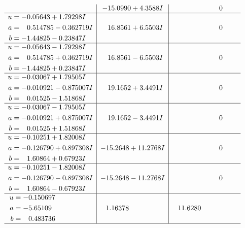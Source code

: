 \documentclass[1p]{elsarticle_modified}
\theoremstyle{definition}
\begin{document}
$$\begin{array}{c|c|c}
 & -15.0990 + 4.3588 I & \phantom{-0.000000 } 0 \\ \hline\begin{aligned}
u &= -0.05643 + 1.79298 I \\
a &= \phantom{-}0.514785 - 0.362719 I \\
b &= -1.44825 - 0.23847 I\end{aligned}
 & \phantom{-}16.8561 + 6.5503 I & \phantom{-0.000000 } 0 \\ \hline\begin{aligned}
u &= -0.05643 - 1.79298 I \\
a &= \phantom{-}0.514785 + 0.362719 I \\
b &= -1.44825 + 0.23847 I\end{aligned}
 & \phantom{-}16.8561 - 6.5503 I & \phantom{-0.000000 } 0 \\ \hline\begin{aligned}
u &= -0.03067 + 1.79505 I \\
a &= -0.010921 - 0.875007 I \\
b &= \phantom{-}0.01525 - 1.51868 I\end{aligned}
 & \phantom{-}19.1652 + 3.4491 I & \phantom{-0.000000 } 0 \\ \hline\begin{aligned}
u &= -0.03067 - 1.79505 I \\
a &= -0.010921 + 0.875007 I \\
b &= \phantom{-}0.01525 + 1.51868 I\end{aligned}
 & \phantom{-}19.1652 - 3.4491 I & \phantom{-0.000000 } 0 \\ \hline\begin{aligned}
u &= -0.10251 + 1.82008 I \\
a &= -0.126790 + 0.897308 I \\
b &= \phantom{-}1.60864 + 0.67923 I\end{aligned}
 & -15.2648 + 11.2768 I & \phantom{-0.000000 } 0 \\ \hline\begin{aligned}
u &= -0.10251 - 1.82008 I \\
a &= -0.126790 - 0.897308 I \\
b &= \phantom{-}1.60864 - 0.67923 I\end{aligned}
 & -15.2648 - 11.2768 I & \phantom{-0.000000 } 0 \\ \hline\begin{aligned}
u &= -0.150697\phantom{ +0.000000I} \\
a &= -5.65109\phantom{ +0.000000I} \\
b &= \phantom{-}0.483736\phantom{ +0.000000I}\end{aligned}
 & \phantom{-}1.16378\phantom{ +0.000000I} & \phantom{-}11.6280\phantom{ +0.000000I}\\
 \hline 
 \end{array}$$\newpage\newpage\renewcommand{\arraystretch}{1}
\end{document}
